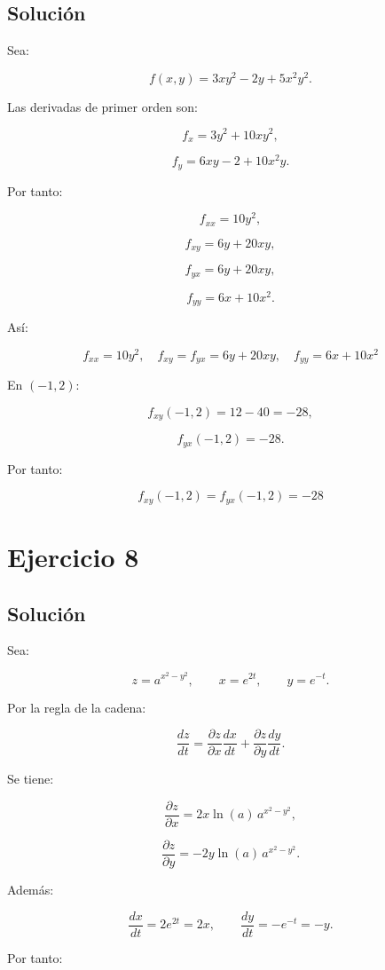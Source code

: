 \documentclass[11pt,a4paper]{article}
\begin{document}
\subsection{Solución}

Sea:

\[
f(x,y)
=
3xy^2-2y+5x^2y^2.
\]

Las derivadas de primer orden son:

\[
f_x
=
3y^2+10xy^2,
\]

\[
f_y
=
6xy-2+10x^2y.
\]

Por tanto:

\[
f_{xx}
=
10y^2,
\]

\[
f_{xy}
=
6y+20xy,
\]

\[
f_{yx}
=
6y+20xy,
\]

\[
f_{yy}
=
6x+10x^2.
\]

Así:

\[
\boxed{
f_{xx}=10y^2,
\quad
f_{xy}=f_{yx}=6y+20xy,
\quad
f_{yy}=6x+10x^2
}
\]

En \((-1,2)\):

\[
f_{xy}(-1,2)
=
12-40
=
-28,
\]

\[
f_{yx}(-1,2)
=
-28.
\]

Por tanto:

\[
\boxed{
f_{xy}(-1,2)=f_{yx}(-1,2)=-28
}
\]

\section{Ejercicio 8}
\subsection{Solución}

Sea:

\[
z=a^{x^2-y^2},
\qquad
x=e^{2t},
\qquad
y=e^{-t}.
\]

Por la regla de la cadena:

\[
\frac{dz}{dt}
=
\frac{\partial z}{\partial x}
\frac{dx}{dt}
+
\frac{\partial z}{\partial y}
\frac{dy}{dt}.
\]

Se tiene:

\[
\frac{\partial z}{\partial x}
=
2x\ln(a)\,a^{x^2-y^2},
\]

\[
\frac{\partial z}{\partial y}
=
-2y\ln(a)\,a^{x^2-y^2}.
\]

Además:

\[
\frac{dx}{dt}=2e^{2t}=2x,
\qquad
\frac{dy}{dt}=-e^{-t}=-y.
\]

Por tanto:
\end{document}
